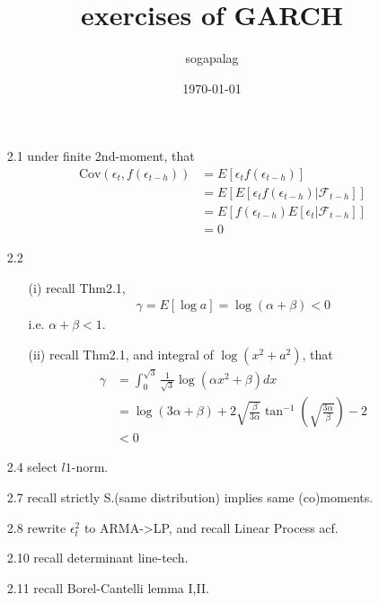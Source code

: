 \documentclass[paper=a4, fontsize=11pt]{scrartcl} %
\title{exercises of GARCH}
\author{sogapalag}
\date{\normalsize\today}
\numberwithin{equation}{section} %
\numberwithin{figure}{section} %
\numberwithin{table}{section} %
\def \cov {\text{Cov}}
\begin{document}
\maketitle
\begin{itemize}
	\item[2.1] under finite 2nd-moment, that
	\begin{align}
		\cov(\epsilon_t,f(\epsilon_{t-h})) &= E[\epsilon_t f(\epsilon_{t-h})]\\
			&= E[E[\epsilon_t f(\epsilon_{t-h})|\mathcal{F}_{t-h}]]\\
			&= E[f(\epsilon_{t-h})E[\epsilon_t|\mathcal{F}_{t-h}]]\\
			&= 0
	\end{align}
	\item[2.2]
	\begin{itemize}
		\item[(i)] recall Thm2.1, 
		\begin{align}
			\gamma = E[\log a] = \log(\alpha+\beta)<0
		\end{align}
		i.e. $\alpha+\beta<1$.
		\item[(ii)] recall Thm2.1, and integral of $\log(x^2+a^2)$, that
		\begin{align}
			\gamma &= \int_{0}^{\sqrt{3}} \frac{1}{\sqrt{3}}\log(\alpha x^2+\beta)dx \\
				&= \log(3\alpha+\beta) + 2\sqrt{\frac{\beta}{3\alpha}}\tan^{-1}(\sqrt{\frac{3\alpha}{\beta}}) - 2\\
				&<0
		\end{align}
	\end{itemize}
	\item[2.4] select $l1$-norm.
	\item[2.7] recall strictly S.(same distribution) implies same (co)moments.
	\item[2.8] rewrite $\epsilon_t^2$ to ARMA->LP, and recall Linear Process acf.
	\item[2.10] recall determinant line-tech.
	\item[2.11] recall Borel-Cantelli lemma I,II.
\end{itemize}
\end{document}
